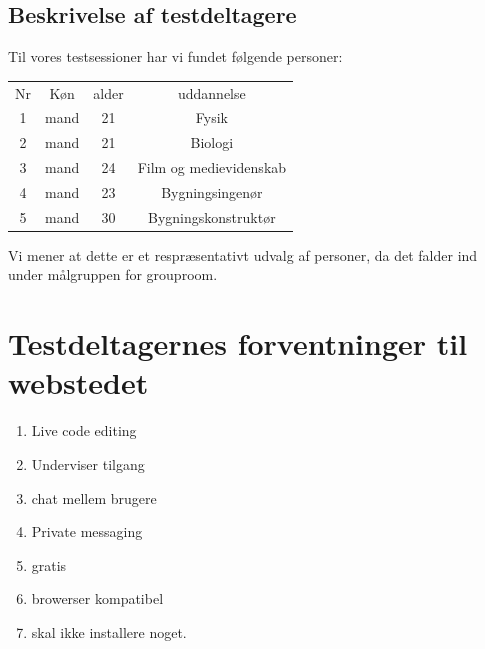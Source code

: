\documentclass[12pt]{article}
\begin{document}
\subsection{Beskrivelse af testdeltagere}
Til vores testsessioner har vi fundet følgende personer:
\begin{center}
  \begin{tabular}{*{4}{|c}|}
    \hline
    Nr & Køn & alder & uddannelse \\
    1 & mand & 21 & Fysik \\
    2 & mand & 21 & Biologi \\
    3 & mand & 24 & Film og medievidenskab \\
    4 & mand & 23 & Bygningsingenør\\
    5 & mand & 30 & Bygningskonstruktør\\
    \hline
  \end{tabular}
\end{center}
Vi mener at dette er et respræsentativt udvalg af personer, da det falder ind under målgruppen for grouproom.
\section{Testdeltagernes forventninger til webstedet}
\begin{enumerate}
  \item Live code editing 
  \item Underviser tilgang 
  \item chat mellem brugere 
  \item Private messaging 
  \item gratis 
  \item browerser kompatibel
  \item skal ikke installere noget. 
\end{enumerate}

\newpage
\end{document}
